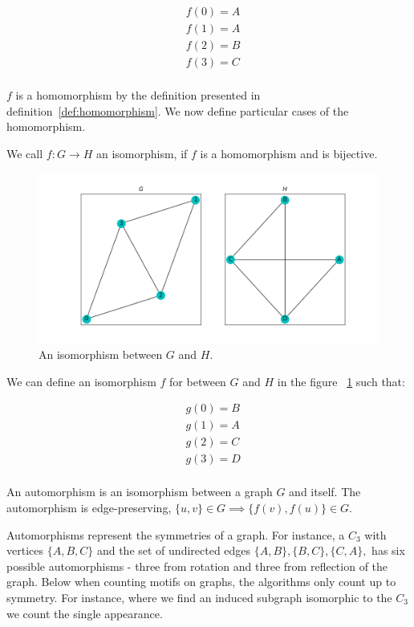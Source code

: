\begin{align*}
    &f(0) = A\\
    &f(1) = A\\
    &f(2) = B\\
    &f(3) = C\\ 
\end{align*}

\noindent $f$ is a homomorphism by the definition presented in definition~\ref{def:homomorphism}. 
We now define particular cases of the homomorphism.

\begin{dfn}
    We call $f: G \rightarrow H$ an isomorphism,
 if $f$ is a homomorphism and is bijective.
\end{dfn}

\begin{figure}[h!]
    \includegraphics[width=12cm]{Images/graph_isomoprhism.png}
    \centering
    \caption{An isomorphism between $G$ and $H$.}
    \label{fig:isomorphism}
\end{figure}

\noindent We can define an isomorphism $f$ for between $G$ and $H$ in the figure ~\ref{fig:isomorphism} such that:

\begin{align*}
    &g(0) = B\\
    &g(1) = A\\
    &g(2) = C\\
    &g(3) = D\\ 
\end{align*}

\begin{dfn}
    An automorphism is an isomorphism between a graph $G$ and itself. The automorphism 
    is edge-preserving, $\{u,v\} \in G \implies \{f(v),f(u)\} \in G$.
\end{dfn}

Automorphisms represent the symmetries of a graph. For instance, a $C_3$ with vertices $\{A, B, C\}$
and the set of undirected edges $\{A,B\},\{B,C\},\{C,A\},$ has six possible automorphisms - three from rotation 
and three from reflection of the graph. Below when counting motifs on graphs, the algorithms only count up to symmetry.
For instance, where we find an induced subgraph isomorphic to the $C_3$ we count the single appearance. 


